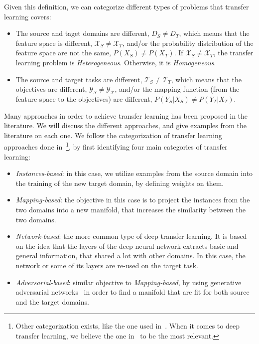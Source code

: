   \par Given this definition, we can categorize different types of problems that transfer learning covers:

  \begin{itemize}
      \item The source and taget domains are different, $D_S \neq D_T$, which means that the feature space is different, $\mathcal{X}_S \neq \mathcal{X}_T$, and/or the probability distribution of the feature space are not the same, $P(X_S) \neq P(X_T)$. If $\mathcal{X}_S \neq \mathcal{X}_T$, the transfer learning problem is \textit{Heterogeneous}. Otherwise, it is \textit{Homogeneous}.

      \item The source and target tasks are different, $\mathcal{T}_S \neq \mathcal{T}_T$, which means that the objectives are different, $\mathcal{Y_S} \neq \mathcal{Y_T}$, and/or the mapping function (from the feature space to the objectives) are different, $P(Y_S|X_S) \neq P(Y_T|X_T)$.
  \end{itemize}

  \par Many approaches in order to achieve transfer learning has been proposed in the literature. We will discuss the different approaches, and give examples from the literature on each one. We follow the categorization of transfer learning approaches done in~\citep{dtl2018survey}\footnote{Other categorization exists, like the one used in~\citep{weiss2016survey}. When it comes to deep transfer learning, we believe the one in~\citep{dtl2018survey} to be the most relevant.}, by first identifying four main categories of transfer learning:
  \begin{itemize}
    \item \textit{Instances-based}: in this case, we utilize examples from the source domain into the training of the new target domain, by defining weights on them.
    \item \textit{Mapping-based}: the objective in this case is to project the instances from the two domains into a new manifold, that increases the similarity between the two domains.
    \item \textit{Network-based}: the more common type of deep transfer learning. It is based on the idea that the layers of the deep neural network extracts basic and general information, that shared a lot with other domains. In this case, the network or some of its layers are re-used on the target task.
    \item \textit{Adversarial-based}: similar objective to \textit{Mapping-based}, by using generative adversarial networks~\citep{goodfellow2014generative} in order to find a manifold that are fit for both source and the target domains.
  \end{itemize}

